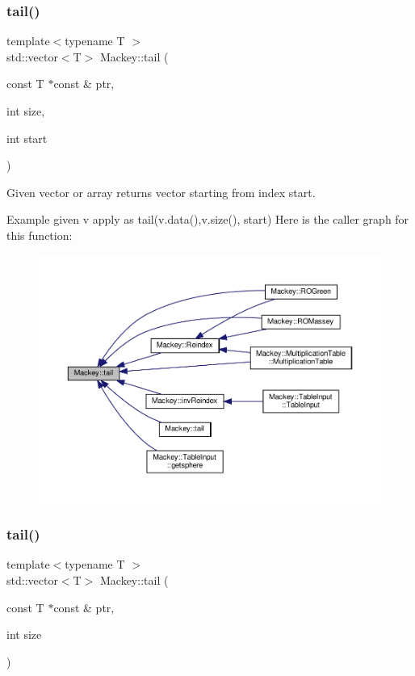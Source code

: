 \subsubsection{\texorpdfstring{tail()}{tail()}\hspace{0.1cm}{\footnotesize\ttfamily [1/2]}}
{\footnotesize\ttfamily template$<$typename T $>$ \\
std\+::vector$<$T$>$ Mackey\+::tail (\begin{DoxyParamCaption}\item[{const T $\ast$const \&}]{ptr,  }\item[{int}]{size,  }\item[{int}]{start }\end{DoxyParamCaption})\hspace{0.3cm}{\ttfamily [inline]}}



Given vector or array returns vector starting from index start. 

Example given v apply as tail(v.\+data(),v.\+size(), start) Here is the caller graph for this function\+:\nopagebreak
\begin{figure}[H]
\begin{center}
\leavevmode
\includegraphics[width=350pt]{namespaceMackey_a1e4b11e9d2a5b70f8380af87cae31ef3_icgraph}
\end{center}
\end{figure}
\mbox{\label{namespaceMackey_a4403b34f0680dfccf2ab79111f832ba3}} 
\subsubsection{\texorpdfstring{tail()}{tail()}\hspace{0.1cm}{\footnotesize\ttfamily [2/2]}}
{\footnotesize\ttfamily template$<$typename T $>$ \\
std\+::vector$<$T$>$ Mackey\+::tail (\begin{DoxyParamCaption}\item[{const T $\ast$const \&}]{ptr,  }\item[{int}]{size }\end{DoxyParamCaption})\hspace{0.3cm}{\ttfamily [inline]}}



